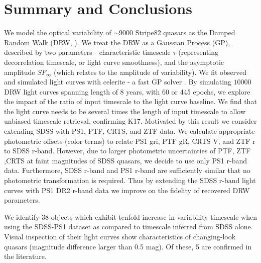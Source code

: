 \documentclass[twocolumn]{aastex62}
\newcommand{\project}[1]{\textsf{#1}}
\begin{document}
%
%
%
%

\section{Summary and Conclusions}
\label{sec:conclusions}
We model the optical variability of ${\sim} 9000$ Stripe82 quasars as the Damped Random Walk (DRW, \citealt{kelly2009}). We treat the DRW as a Gaussian Process (GP), described by two parameters - characteristic timescale $\tau$ (representing decorrelation timescale, or light curve smoothness), and the asymptotic amplitude $SF_{\infty}$ (which relates to the amplitude of variability). We fit observed and simulated light curves with \project{celerite} - a fast GP solver \citep{foreman2017}. By simulating $10 000$  DRW light curves spanning length of 8 years, with 60 or 445 epochs, we explore the impact of the ratio of input timescale to the light curve baseline. We find that the light curve needs to be several times the length of input timescale to allow unbiased timescale retrieval, confirming K17. Motivated by this result we consider extending SDSS with PS1, PTF, CRTS, and ZTF data.  We calculate appropriate photometric offsets (color terms) to relate PS1 gri, PTF gR,  CRTS V, and ZTF r to SDSS r-band. However, due to larger photometric uncertainties of PTF, ZTF ,CRTS at faint magnitudes of SDSS quasars, we decide to use only PS1 r-band data. Furthermore, SDSS r-band and PS1 r-band are sufficiently similar that no photometric transformation is required.  Thus by extending the SDSS r-band light curves with PS1 DR2 r-band data we improve on the fidelity of recovered DRW parameters. 

We identify 38 objects which exhibit tenfold increase in variability timescale when using the SDSS-PS1 dataset as compared to timescale inferred from SDSS alone. Visual inspection of their light curves show characteristics of changing-look quasars (magnitude difference larger than 0.5 mag). Of these, 5 are confirmed in the literature\citep{macleod2019, lamassa2015}. 
\end{document}

